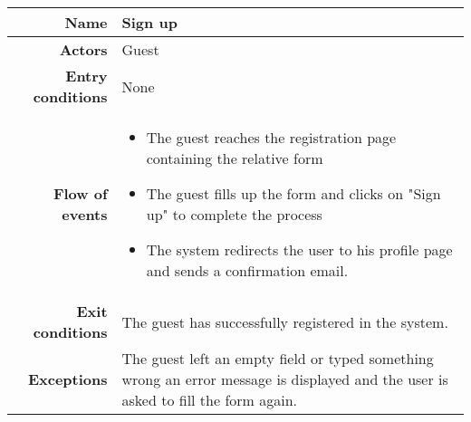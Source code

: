 \begin{center}
\begin{tabular}{r|p{7cm}}
\bf\large Name&\bf\large Sign up\\
\hline
\hline
\bf Actors&Guest\\
\hline
\bf Entry conditions&None\\
\hline
\bf Flow of events&
\begin{itemize}
\item The guest reaches the registration page containing the relative form
\item The guest fills up the form and clicks on "Sign up" to complete the process
\item The system redirects the user to his profile page and sends a confirmation email.
\end{itemize}
\\
\hline
\bf Exit conditions&The guest has successfully registered in the system. \\
\hline
\bf Exceptions&The guest left an empty field or typed
 something wrong an error message is displayed 
 and the user is asked to fill the form again.\\
\hline

\end{tabular}
\end{center}